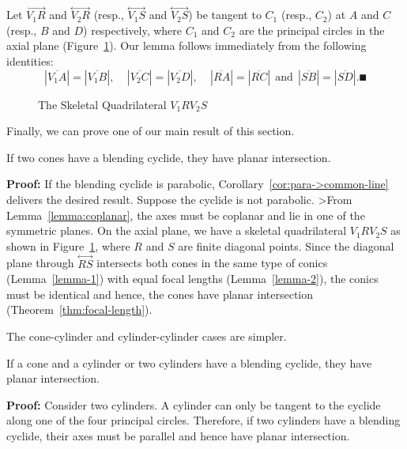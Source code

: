      Let $\stackrel{\longleftrightarrow}{V_1R}$ and
$\stackrel{\longleftrightarrow}{V_2R}$ (resp.,
$\stackrel{\longleftrightarrow}{V_1S}$ and
$\stackrel{\longleftrightarrow}{V_2S}$) be tangent to $C_1$ (resp., $C_2$) at
$A$ and $C$ (resp., $B$ and $D$) respectively, where $C_1$ and $C_2$ are the 
principal circles in the axial plane (Figure~\ref{fig:Q-RS}).  Our lemma
follows immediately from the following identities:
\[ |\overline{V_1A}|=|\overline{V_1B}|,\ \ \ \ \ 
   |\overline{V_2C}|=|\overline{V_2D}|,\ \ \ \ \ 
   |\overline{RA}|=|\overline{RC}|\ \ \mbox{and}\ \  
   |\overline{SB}|=|\overline{SD}|. \QED \]

\begin{figure}
\vspace{6.5cm}
\caption{The Skeletal Quadrilateral $V_1RV_2S$}
\label{fig:Q-RS}
\end{figure}

     Finally, we can prove one of our main result of this section.

\begin{lemma}
\label{lemma:cyclide->planar}
     If two cones have a blending cyclide, they have planar intersection.
\end{lemma}
{\bf Proof:}  If the blending cyclide is parabolic, 
Corollary~\ref{cor:para->common-line} delivers the desired result. 
Suppose the cyclide is not parabolic.
>From Lemma~\ref{lemma:coplanar}, the axes must be coplanar and
lie in one of the symmetric planes.  On the axial plane, we have a skeletal
quadrilateral $V_1RV_2S$ as shown in Figure~\ref{fig:Q-RS}, where $R$ and $S$
are finite diagonal points.  Since the diagonal plane through 
$\stackrel{\longleftrightarrow}{RS}$ intersects both cones in the same type of
conics (Lemma~\ref{lemma-1}) with equal focal lengths
(Lemma~\ref{lemma-2}), the conics must be identical
and hence, the cones have planar intersection
(Theorem~\ref{thm:focal-length}).  \QED

     The cone-cylinder and cylinder-cylinder cases are simpler.

\begin{lemma}
\label{lemma:cyclide-planar-for-cys}
     If a cone and a cylinder or two cylinders have a blending cyclide,
they have planar intersection.
\end{lemma}
{\bf Proof:}  Consider two cylinders.  A cylinder can only be tangent to the 
cyclide along one of the four principal circles.  Therefore, if two cylinders 
have a blending cyclide, their axes must be parallel and hence have planar
intersection.

